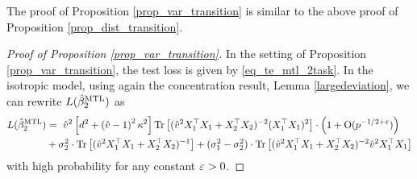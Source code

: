 The proof of Proposition \ref{prop_var_transition} is similar to the above proof of Proposition \ref{prop_dist_transition}.


\begin{proof}[Proof of Proposition \ref{prop_var_transition}]
In the setting of Proposition \ref{prop_var_transition}, the test loss is given by \eqref{eq_te_mtl_2task}. 
In the isotropic model, using again the concentration result, Lemma \ref{largedeviation}, we can rewrite $L(\hat{\beta}_2^{\text{MTL}})$ as
\begin{align*}
	L(\hat{\beta}_2^{\text{MTL}}) &=~ \hat{v}^2 \left[d^2 +\left( \hat v-1\right)^2\kappa^2\right]\operatorname{Tr}\left[ (\hat{v}^2 X_1^{\top}X_1 + X_2^{\top}X_2)^{-2} (X_1^{\top}X_1)^2\right] \cdot \left(1+\operatorname{O}(p^{-1/2+{\varepsilon}})\right)\nonumber \\
	& + \sigma_2^2 \cdot \operatorname{Tr}\left[(\hat{v}^2 X_1^{\top}X_1 + X_2^{\top}X_2)^{-1} \right] + (\sigma_1^2 -\sigma_2^2)  \cdot \operatorname{Tr}\left[(\hat{v}^2 X_1^{\top}X_1 + X_2^{\top}X_2)^{-2} \hat v^2X_1^\top X_1\right]
\end{align*}
with high probability for any constant ${\varepsilon}>0$. 




\end{proof}
